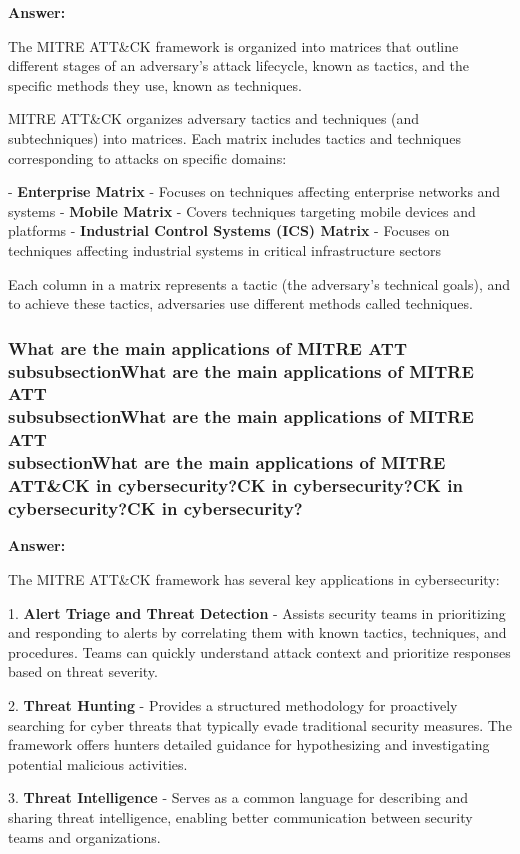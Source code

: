 \documentclass[12pt,a4paper]{article}
\begin{document}
\textbf{Answer:}

The MITRE ATT\&CK framework is organized into matrices that outline different stages of an adversary's attack lifecycle, known as tactics, and the specific methods they use, known as techniques. 

MITRE ATT\&CK organizes adversary tactics and techniques (and subtechniques) into matrices. Each matrix includes tactics and techniques corresponding to attacks on specific domains: 

- \textbf{Enterprise Matrix} - Focuses on techniques affecting enterprise networks and systems
- \textbf{Mobile Matrix} - Covers techniques targeting mobile devices and platforms
- \textbf{Industrial Control Systems (ICS) Matrix} - Focuses on techniques affecting industrial systems in critical infrastructure sectors

Each column in a matrix represents a tactic (the adversary's technical goals), and to achieve these tactics, adversaries use different methods called techniques. 

\subsubsection{What are the main applications of MITRE ATT\\subsubsection{What are the main applications of MITRE ATT\\subsubsection{What are the main applications of MITRE ATT\\subsection{What are the main applications of MITRE ATT\&CK in cybersecurity?}CK in cybersecurity?}CK in cybersecurity?}CK in cybersecurity?}

\textbf{Answer:}

The MITRE ATT\&CK framework has several key applications in cybersecurity: 

1. \textbf{Alert Triage and Threat Detection} - Assists security teams in prioritizing and responding to alerts by correlating them with known tactics, techniques, and procedures. Teams can quickly understand attack context and prioritize responses based on threat severity.

2. \textbf{Threat Hunting} - Provides a structured methodology for proactively searching for cyber threats that typically evade traditional security measures. The framework offers hunters detailed guidance for hypothesizing and investigating potential malicious activities.

3. \textbf{Threat Intelligence} - Serves as a common language for describing and sharing threat intelligence, enabling better communication between security teams and organizations.
\end{document}
